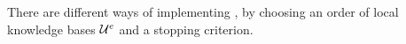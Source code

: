 There are different ways of implementing , by choosing an order of local knowledge bases $\mathcal{U}^{e}$ and a stopping criterion.

%


